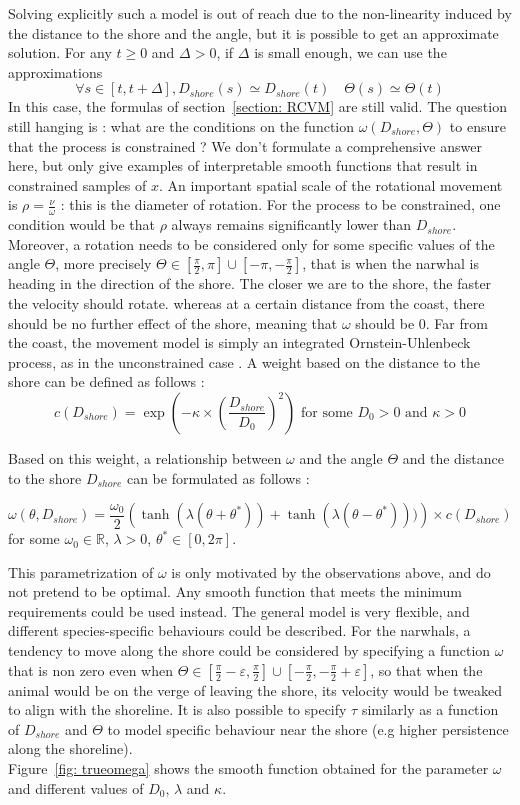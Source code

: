 \documentclass[11pt]{article}
\newcommand {\R}{\mathbb{R}}
\newcommand {\1}{\mathbb{1}}
\begin{document}
 Solving explicitly such a model is out of reach due to the non-linearity induced by the distance to the shore and the angle, but it is possible to get an approximate solution.
 For any $t \geq 0$ and $\Delta>0$, if $\Delta$ is small enough, we can use the approximations
 \[\forall s \in [t,t+\Delta], D_{shore}(s) \simeq D_{shore}(t) \quad \Theta(s)\simeq \Theta(t)\]
 In this case, the formulas of section~\ref{section: RCVM} are still valid.
 The question still hanging is : what are the conditions on the function $\omega(D_{shore},\Theta)$ to ensure that the process is constrained ?
 We don't formulate a comprehensive answer here, but only give examples of interpretable smooth functions that result in constrained samples of $x$.
 An important spatial scale of the rotational movement is $\rho=\frac{\nu}{\omega}$ : this is the diameter of rotation. For the process to be constrained, one condition would be that $\rho$ always remains significantly lower than $D_{shore}$. Moreover, a rotation needs to be considered only for some specific values of the angle $\Theta$, more precisely $\Theta \in \left[\frac{\pi}{2},\pi\right] \cup \left[-\pi,-\frac{\pi}{2}\right]$, that is when the narwhal is heading in the direction of the shore.
 The closer we are to the shore, the faster the velocity should rotate. 
 whereas at a certain distance from the coast, there should be no further effect of the shore, meaning that $\omega$ should be $0$. Far from the coast, the movement model is simply an integrated Ornstein-Uhlenbeck process, as in the unconstrained case \cite{johnson_continuoustime_2008}.
 A weight based on the distance to the shore can be defined as follows :
 \[c(D_{shore})=\exp\left(-\kappa \times \left(\frac{D_{shore}}{D_0}\right)^2\right)\mbox{ for some } D_0>0 \mbox{ and } \kappa>0\]
 
 Based on this weight, a relationship between $\omega$ and the angle $\Theta$ and the distance to the shore $D_{shore}$ can be formulated as follows :
 
 \[
 \omega(\theta,D_{shore})=\frac{\omega_0}{2}\left(\tanh(\lambda(\theta+\theta^{*}))+\tanh(\lambda(\theta-\theta^{*})))\right)\times c(D_{shore})
 \]
 for some $\omega_0 \in \R$, $\lambda>0$, $\theta^* \in [0,2\pi]$.
 
 This parametrization of $\omega$ is only motivated by the observations above, and do not pretend to be optimal. Any smooth function that meets the minimum requirements could be used instead. The general model is very flexible, and different species-specific behaviours could be described. For the narwhals, a tendency to move along the shore could be considered by specifying a function $\omega$ that is non zero even when $\Theta \in \left[\frac{\pi}{2}-\varepsilon,\frac{\pi}{2}\right] \cup \left[-\frac{\pi}{2},-\frac{\pi}{2}+\varepsilon\right]$, so that when the animal would be on the verge of leaving the shore, its velocity would be tweaked to align with the shoreline. It is also possible  to specify $\tau$ similarly as a function of $D_{shore}$ and $\Theta$ to model specific behaviour near the shore (e.g higher persistence along the shoreline).\\
 Figure~\ref{fig: trueomega} shows the smooth function obtained for the parameter $\omega$ and different values of $D_0$, $\lambda$ and $\kappa$.
 
\end{document}
